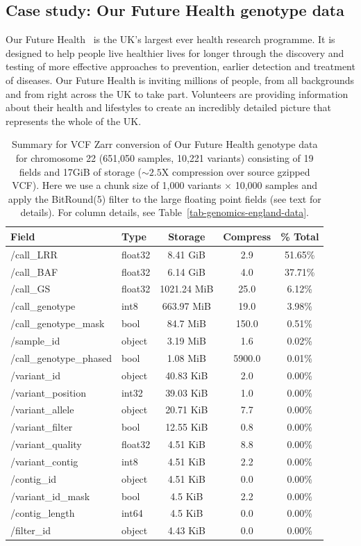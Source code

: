\documentclass[a4paper,num-refs]{oup-contemporary}
\begin{document}
\subsection{Case study: Our Future Health genotype data}
Our Future Health~\cite{ofhmain_2025}  is the UK’s largest ever health research programme.
It is designed to help people live healthier lives for longer through the
discovery and testing of more effective approaches to prevention, earlier
detection and treatment of diseases.
Our Future Health is inviting millions of people, from all backgrounds and
from right across the UK to take part. Volunteers are providing information
about their health and lifestyles to create an incredibly detailed picture
that represents the whole of the UK.

\begin{table}
\caption{Summary for VCF Zarr conversion of 
Our Future Health genotype data for chromosome 22 (651,050 samples, 10,221
variants) consisting of 19 fields and 17GiB of storage ($\sim2.5$X compression
over source gzipped VCF).
Here we use a chunk size of 1,000 variants $\times$ 10,000 samples and 
apply the BitRound(5) filter to the large floating point fields (see text for 
details).
For column details, see Table~\ref{tab-genomics-england-data}.
    \label{tab-ofh-data}}
\begin{tabular}{llS[table-format=3.2]S[table-format=4.1]S[table-format=3.2]}
\toprule
{Field} & {Type} & {Storage} & {Compress} & {\% Total} \\
\midrule
/call\_LRR & float32 & 8.41 GiB & 2.9 & 51.65\% \\
/call\_BAF & float32 & 6.14 GiB & 4.0 & 37.71\% \\
/call\_GS & float32 & 1021.24 MiB & 25.0 & 6.12\% \\
/call\_genotype & int8 & 663.97 MiB & 19.0 & 3.98\% \\
/call\_genotype\_mask & bool & 84.7 MiB & 150.0 & 0.51\% \\
/sample\_id & object & 3.19 MiB & 1.6 & 0.02\% \\
/call\_genotype\_phased & bool & 1.08 MiB & 5900.0 & 0.01\% \\
/variant\_id & object & 40.83 KiB & 2.0 & 0.00\% \\
/variant\_position & int32 & 39.03 KiB & 1.0 & 0.00\% \\
/variant\_allele & object & 20.71 KiB & 7.7 & 0.00\% \\
/variant\_filter & bool & 12.55 KiB & 0.8 & 0.00\% \\
/variant\_quality & float32 & 4.51 KiB & 8.8 & 0.00\% \\
/variant\_contig & int8 & 4.51 KiB & 2.2 & 0.00\% \\
/contig\_id & object & 4.51 KiB & 0.0 & 0.00\% \\
/variant\_id\_mask & bool & 4.5 KiB & 2.2 & 0.00\% \\
/contig\_length & int64 & 4.5 KiB & 0.0 & 0.00\% \\
/filter\_id & object & 4.43 KiB & 0.0 & 0.00\% \\
\bottomrule
\end{tabular}
\end{table}
\end{document}
